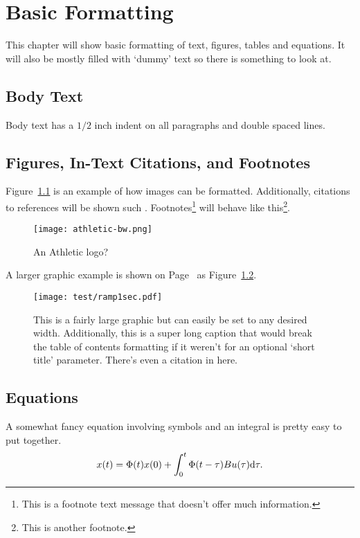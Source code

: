 \chapter{Basic Formatting}
This chapter will show basic formatting of text, figures, tables and equations. It will also be mostly filled with `dummy' text so there is something to look at.

\section{Body Text}
Body text has a $1/2$ inch indent on all paragraphs and double spaced lines.
\lipsum[6]
\section{Figures, In-Text Citations, and Footnotes}
Figure~\ref{fig:athletic logo} is an example of how images can be formatted. Additionally, citations to references will be shown such \cite{latexcompanion}. Footnotes\footnote{This is a footnote text message that doesn't offer much information.} will behave like this\footnote{This is another footnote.}.

\begin{figure}[!ht]
	\centering
	\footnotesize
	\texttt{[image: athletic-bw.png]}
	\caption{An Athletic logo?}
	\label{fig:athletic logo}
\end{figure}\vspace{-1em} %

A larger graphic example is shown on Page~\pageref{fig:ramp test 1} as Figure~\ref{fig:ramp test 1}. \lipsum[8] 

\begin{figure}[!ht]
	\centering
	\texttt{[image: test/ramp1sec.pdf]}
	\caption[60 Second Ramp Test.]{This is a fairly large graphic but can easily be set to any desired width. Additionally, this is a super long caption that would break the table of contents formatting if it weren't for an optional `short title' parameter. There's even a citation in here\cite{stajcar}.}
	\label{fig:ramp test 1}
\end{figure}%

\lipsum[15]

\section{Equations}
	A somewhat fancy equation involving symbols and an integral is pretty easy to put together. \lipsum[5] %
	\begin{equation}{\label{eq:ssSoln}}
		x(t) = \Phi(t) x(0) + \int_{0}^{t}\Phi(t-\tau)Bu(\tau) \text{d}\tau.
	\end{equation}

